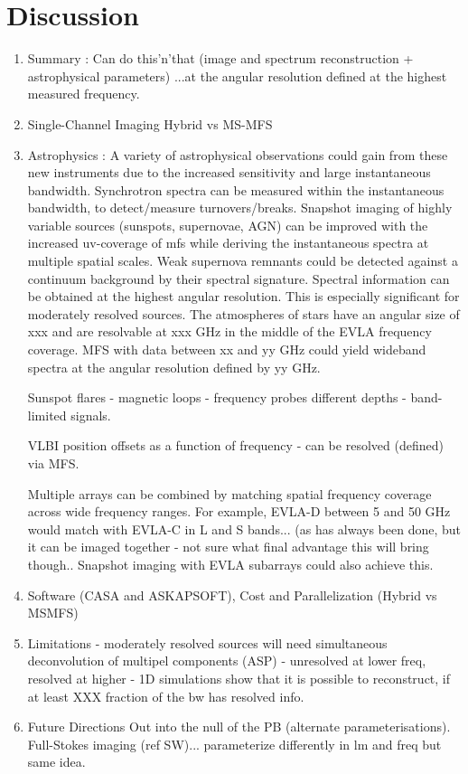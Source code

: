 \documentclass[structabstract]{aa}
\begin{document}
\section{Discussion}
\begin{enumerate}
\item { Summary : Can do this'n'that (image and spectrum reconstruction + astrophysical parameters)}
...at the angular resolution defined at the highest measured frequency.
\item Single-Channel Imaging Hybrid vs MS-MFS
\item Astrophysics : A variety of astrophysical observations could gain from these new instruments due to the 
increased sensitivity and large instantaneous bandwidth. Synchrotron spectra can be measured
within the instantaneous bandwidth, to detect/measure turnovers/breaks.
Snapshot imaging of highly variable sources 
(sunspots, supernovae, AGN) can be improved with the increased uv-coverage of mfs while
deriving the instantaneous spectra at multiple spatial scales.
Weak supernova remnants could be detected against a continuum background by their spectral signature.
Spectral information can be obtained at the highest angular resolution. This is especially 
significant for moderately resolved sources. 
The atmospheres of stars have an angular size of xxx and are resolvable at xxx GHz in the middle
of the EVLA frequency coverage. MFS with data between xx and yy GHz could yield wideband spectra
at the angular resolution defined by yy GHz.

Sunspot flares - magnetic loops - frequency probes different depths - band-limited signals.

VLBI position offsets as a function of frequency - can be resolved (defined) via MFS.

Multiple arrays can be combined by matching spatial frequency coverage across wide frequency ranges.
For example, EVLA-D between 5 and 50 GHz would match with EVLA-C in L and S bands... (as has always
been done, but it can be imaged together - not sure what final advantage this will bring though..
Snapshot imaging with EVLA subarrays could also achieve this.

\item Software (CASA and ASKAPSOFT), Cost and Parallelization (Hybrid vs MSMFS)
\item { Limitations }
- moderately resolved sources will need simultaneous deconvolution of multipel components (ASP)
- unresolved at lower freq, resolved at higher - 1D simulations show that it is possible to reconstruct, if at least XXX fraction of the bw has resolved info.
\item { Future Directions }
Out into the null of the PB (alternate parameterisations).
Full-Stokes imaging (ref SW)... parameterize differently in lm and freq but same idea.
\end{enumerate}
\end{document}
